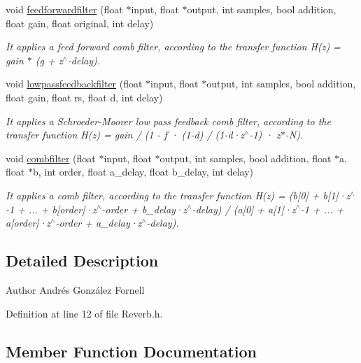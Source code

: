 \begin{DoxyCompactItemize}
void \hyperlink{class_reverb_aabbbdbef25b5d4518e5611c608c37b0a}{feedforwardfilter} (float $\ast$input, float $\ast$output, int samples, bool addition, float gain, float original, int delay)
\begin{DoxyCompactList}\small\item\em It applies a feed forward comb filter, according to the transfer function H(z) = gain $\ast$ (g + z$^\wedge$-\/delay). \end{DoxyCompactList}\item 
void \hyperlink{class_reverb_a43184fe4ef185da6d7d6049c3866c294}{lowpassfeedbackfilter} (float $\ast$input, float $\ast$output, int samples, bool addition, float gain, float rs, float d, int delay)
\begin{DoxyCompactList}\small\item\em It applies a Schroeder-\/\+Moorer low pass feedback comb filter, according to the transfer function H(z) = gain / (1 -\/ f · (1-\/d) / (1-\/d·z$^\wedge$-\/1) · z$\ast$-\/N). \end{DoxyCompactList}\item 
void \hyperlink{class_reverb_ab6dd1add7689fcf4ef2d2958e0a5acc4}{combfilter} (float $\ast$input, float $\ast$output, int samples, bool addition, float $\ast$a, float $\ast$b, int order, float a\+\_\+delay, float b\+\_\+delay, int delay)
\begin{DoxyCompactList}\small\item\em It applies a comb filter, according to the transfer function H(z) = (b\mbox{[}0\mbox{]} + b\mbox{[}1\mbox{]}·z$^\wedge$-\/1 + ... + b\mbox{[}order\mbox{]}·z$^\wedge$-\/order + b\+\_\+delay·z$^\wedge$-\/delay) / (a\mbox{[}0\mbox{]} + a\mbox{[}1\mbox{]}·z$^\wedge$-\/1 + ... + a\mbox{[}order\mbox{]}·z$^\wedge$-\/order + a\+\_\+delay·z$^\wedge$-\/delay). \end{DoxyCompactList}\end{DoxyCompactItemize}


\subsection{Detailed Description}
\begin{DoxyAuthor}{Author}
Andrés González Fornell 
\end{DoxyAuthor}


Definition at line 12 of file Reverb.\+h.



\subsection{Member Function Documentation}
\mbox{\label{class_reverb_aba9f2e90b04114cc9525b3b4cabfecf9}} 
